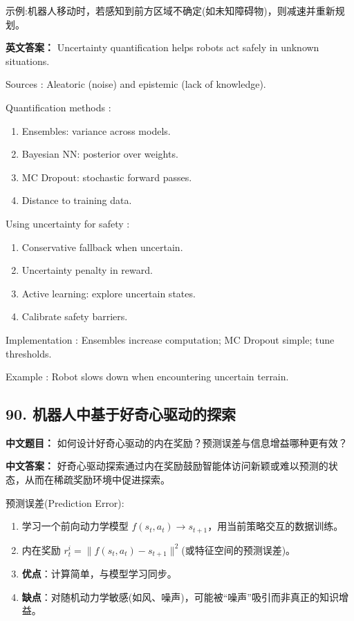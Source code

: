 \documentclass[10pt,a4paper]{ctexart}
\begin{document}
 示例:机器人移动时，若感知到前方区域不确定(如未知障碍物)，则减速并重新规划。

\textbf{英文答案：}  
Uncertainty quantification helps robots act safely in unknown situations.

 Sources : Aleatoric (noise) and epistemic (lack of knowledge).

 Quantification methods :
\begin{enumerate}
    \item Ensembles: variance across models.
    \item Bayesian NN: posterior over weights.
    \item MC Dropout: stochastic forward passes.
    \item Distance to training data.
\end{enumerate}

 Using uncertainty for safety :
\begin{enumerate}
    \item Conservative fallback when uncertain.
    \item Uncertainty penalty in reward.
    \item Active learning: explore uncertain states.
    \item Calibrate safety barriers.
\end{enumerate}

 Implementation : Ensembles increase computation; MC Dropout simple; tune thresholds.

 Example : Robot slows down when encountering uncertain terrain.

\subsection*{90. 机器人中基于好奇心驱动的探索}
\textbf{中文题目：} 如何设计好奇心驱动的内在奖励？预测误差与信息增益哪种更有效？

\textbf{中文答案：}  
好奇心驱动探索通过内在奖励鼓励智能体访问新颖或难以预测的状态，从而在稀疏奖励环境中促进探索。

 预测误差(Prediction Error):
\begin{enumerate}
    \item 学习一个前向动力学模型 \(f(s_t, a_t) \rightarrow s_{t+1}\)，用当前策略交互的数据训练。
    \item 内在奖励 \(r^i_t = \| f(s_t, a_t) - s_{t+1} \|^2\)(或特征空间的预测误差)。
    \item \textbf{优点}：计算简单，与模型学习同步。
    \item \textbf{缺点}：对随机动力学敏感(如风、噪声)，可能被“噪声”吸引而非真正的知识增益。
\end{enumerate}
\end{document}
